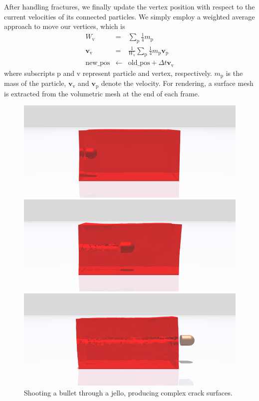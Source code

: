 After handling fractures, we finally update the vertex position with respect to the current velocities of its connected particles.
We simply employ a weighted average approach to move our vertices, which is
\begin{eqnarray}
W_{\mathrm{v}} &=& \sum_{\mathrm{p}} \frac{1}{4}m_{\mathrm{p}}\\
\textbf{v}_{\mathrm{v}} &=& \frac{1}{W_{\mathrm{v}}}\sum_{\mathrm{p}}\frac{1}{4}m_{\mathrm{p}}\textbf{v}_{\mathrm{p}}\\
\mathrm{new\_pos} &\leftarrow& \mathrm{old\_pos} + \Delta t\textbf{v}_{\mathrm{v}}
\end{eqnarray}
where subscripts $\mathrm{p}$ and $\mathrm{v}$ represent particle and vertex, respectively.
$m_{\mathrm{p}}$ is the mass of the particle, $\textbf{v}_{\mathrm{v}}$ and $\textbf{v}_{\mathrm{p}}$ denote the velocity.
For rendering, a surface mesh is extracted from the volumetric mesh at the end of each frame.

\begin{figure}[t]
  \centering
  \includegraphics[width=\linewidth]{./figs/demo_jello.png}
  \caption{\label{fig:6}
  Shooting a bullet through a jello, producing complex crack surfaces.
}
\end{figure}

